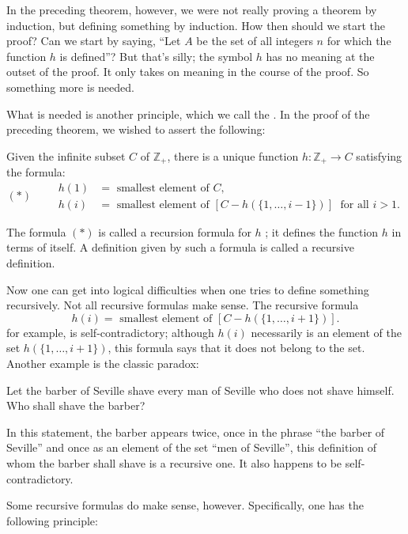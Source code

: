 In the preceding theorem, however, we were not really proving a theorem by induction, but defining something by induction. How then should we start the proof? Can we start by saying, ``Let \(A\) be the set of all integers \(n\) for which the function \(h\) is defined''? But that's silly; the symbol \(h\) has no meaning at the outset of the proof. It only takes on meaning in the course of the proof. So something more is needed.

What is needed is another principle, which we call the . In the proof of the preceding theorem, we wished to assert the following:
\begin{centeredblock}
 Given the infinite subset \(C\) of \(\mathbb{Z}_{+}\), there is a unique function \(h : \mathbb{Z}_{+} \rightarrow C\) satisfying the formula:
 \[
 (*) \qquad
 \begin{aligned}
 h(1) &= \text{ smallest element of }C\text{, } \\
 h(i) &= \text{ smallest element of }[{C - h({\{1,\ldots, i - 1\} }) }] \;\text{ for all }i > 1\text{.}
 \end{aligned}
 \]
\end{centeredblock}

The formula \((*)\) is called a recursion formula for \(h\) ; it defines the function \(h\) in terms of itself. A definition given by such a formula is called a recursive definition.

Now one can get into logical difficulties when one tries to define something recursively. Not all recursive formulas make sense. The recursive formula
\[
h(i) = \text{ smallest element of }[{C - h({\{1,\ldots, i + 1\} }) }] .
\]
for example, is self-contradictory; although \(h(i)\) necessarily is an element of the set \(h({\{1,\ldots, i + 1\} })\), this formula says that it does not belong to the set. Another example is the classic paradox:

\begin{centeredblock}
 Let the barber of Seville shave every man of Seville who does not shave himself. Who shall shave the barber?
\end{centeredblock}
In this statement, the barber appears twice, once in the phrase ``the barber of Seville'' and once as an element of the set ``men of Seville'', this definition of whom the barber shall shave is a recursive one. It also happens to be self-contradictory.

Some recursive formulas do make sense, however. Specifically, one has the following principle:

